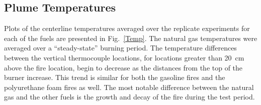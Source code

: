 \documentclass[twoside]{uocthesis}
\begin{document}
{\subsection{Plume Temperatures}

Plots of the centerline temperatures averaged over the replicate experiments for each of the fuels are presented in Fig.~\ref{Temp}. The natural gas temperatures were averaged over a ``steady-state'' burning period.  The temperature differences between the vertical thermocouple locations, for locations greater than 20~cm above the fire location, begin to decrease as the distances from the top of the burner increase.  This trend is similar for both the gasoline fires and the polyurethane foam fires as well.  The most notable difference between the natural gas and the other fuels is the growth and decay of the fire during the test period.

}
\end{document}
